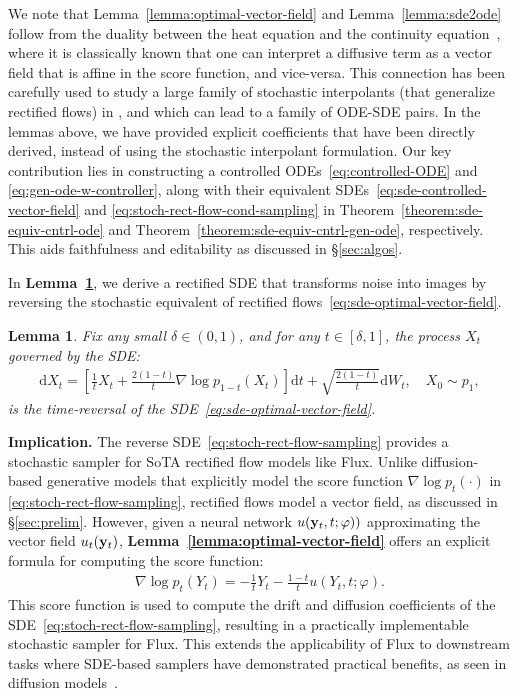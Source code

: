 \documentclass{article} %
\theoremstyle{plain}
\newtheorem{lemma}[theorem]{Lemma}
\newcommand{\deriv}{\mathrm{d}}
\begin{document}
We note that Lemma~\ref{lemma:optimal-vector-field} and Lemma~\ref{lemma:sde2ode} follow from the duality between the heat equation and the continuity equation~\citep{oksendal2003stochastic}, where it is classically known that one can interpret a diffusive term as a vector field that is affine in the score function, and vice-versa. This connection has been carefully used to study a large family of stochastic interpolants (that generalize rectified flows) in \citep{interpolant, interpolants2}, and which can lead to a family of ODE-SDE pairs. In the lemmas above, we have provided explicit coefficients that have been directly derived, instead of using the stochastic interpolant formulation.
Our key contribution lies in constructing a controlled ODEs~\eqref{eq:controlled-ODE} and \eqref{eq:gen-ode-w-controller}, along with their equivalent SDEs~\eqref{eq:sde-controlled-vector-field} and \eqref{eq:stoch-rect-flow-cond-sampling} in Theorem~\ref{theorem:sde-equiv-cntrl-ode} and Theorem~\ref{theorem:sde-equiv-cntrl-gen-ode}, respectively.
This aids faithfulness and editability as discussed in \S\ref{sec:algos}. 


In \textbf{Lemma~\ref{lemma:stoch-rect-flow-sampling}}, we derive a rectified SDE that transforms noise into images by reversing the stochastic equivalent of rectified flows~\eqref{eq:sde-optimal-vector-field}.

\begin{lemma}
\label{lemma:stoch-rect-flow-sampling}
Fix any small $\delta \in (0, 1)$, and for any $t \in [\delta, 1]$, the process $X_t$ governed by the SDE:
\begin{align}
    \label{eq:stoch-rect-flow-sampling}
    \deriv X_t = \left[\frac{1}{t}X_t + \frac{2(1-t)}{t} \nabla \log p_{1-t}(X_t) \right] \deriv t + \sqrt{\frac{2(1-t)}{t}} \deriv W_t, \quad X_0 \sim p_1,
\end{align}
is the time-reversal of the SDE~\eqref{eq:sde-optimal-vector-field}.
\end{lemma}
\textbf{Implication.}
The reverse SDE~\eqref{eq:stoch-rect-flow-sampling} provides a stochastic sampler for SoTA rectified flow models like Flux.
Unlike diffusion-based generative models that explicitly model the score function $\nabla \log p_{t}(\cdot)$ in \eqref{eq:stoch-rect-flow-sampling}, rectified flows model a vector field, as discussed in \S\ref{sec:prelim}.
However, given a neural network $u({\mathbf{y}}_t,t;\varphi))$ approximating the vector field $u_t({\mathbf{y}}_t)$, \textbf{Lemma~\ref{lemma:optimal-vector-field}} offers an explicit formula for computing the score function:
\begin{align}
    \label{eq:flux-to-score}
    \nabla \log p_t(Y_t) = -\frac{1}{t} Y_t - \frac{1-t}{t}u(Y_t,t;\varphi).
\end{align}
This score function is used to compute the drift and diffusion coefficients of the SDE~\eqref{eq:stoch-rect-flow-sampling},
resulting in a practically implementable stochastic sampler for Flux.
This extends the applicability of Flux to downstream tasks where SDE-based samplers have demonstrated practical benefits, as seen in diffusion models~\citep{ddpm,songscore,ldm,sdxl}.
\end{document}
